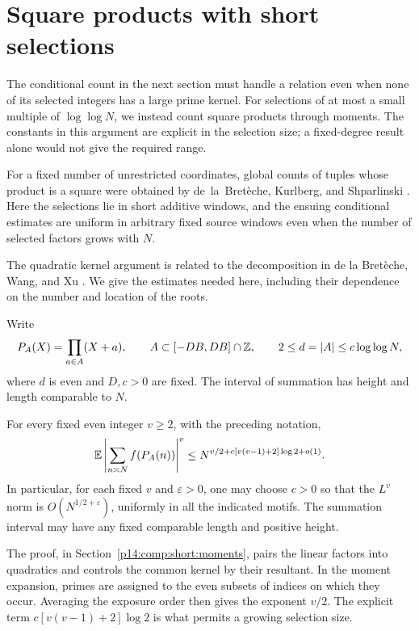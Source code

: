 \section{Square products with short selections}
\label{p13:short:section}

The conditional count in the next section must handle a relation
even when none of its selected integers has a large prime kernel.
For selections of at most a small multiple of \(\log\log N\),
we instead count square products through moments. The constants
in this argument are explicit in the selection size; a
fixed-degree result alone would not give the required range.

For a fixed number of unrestricted coordinates, global counts of
tuples whose product is a square were obtained by de~la~Bret\`eche,
Kurlberg, and Shparlinski
\cite[Theorem~2.2 and Corollary~2.4]{bretkurlbergshparlinski2021}.
Here the selections lie in short additive windows, and the ensuing
conditional estimates are uniform in arbitrary fixed source windows
even when the number of selected factors grows with $N$.

The quadratic kernel argument is related to the decomposition
in de la Bret\`eche, Wang, and Xu
\cite[Lemmas~6.2--6.3]{bretwngxu2026}. We give the estimates
needed here, including their dependence on the number and
location of the roots.


Write
\[
 P_A(X)=\prod_{a\in A}(X+a),\qquad
 A\subset[-DB,DB]\cap\mathbb Z,
 \qquad 2\le d=|A|\le c\log\log N,
\]
where $d$ is even and $D,c>0$ are fixed.  The interval of summation
has height and length comparable to $N$.

\begin{proposition}
\label{p13:short:moments}
For every fixed even integer \(v\ge2\), with the preceding notation,
\begin{equation}
 \mathbb E\left|\sum_{n\asymp N}f(P_A(n))\right|^v
 \le N^{v/2+c[v(v-1)+2]\log2+o(1)}.
 \label{p13:short:moment-bound}
\end{equation}
In particular, for each fixed \(v\) and \(\varepsilon>0\),
one may choose \(c>0\) so that the \(L^v\) norm is
\(O(N^{1/2+\varepsilon})\), uniformly in all the indicated
motifs. The summation interval may have any fixed comparable
length and positive height.
\end{proposition}

The proof, in Section~\ref{p14:comp:short:moments}, pairs the linear
factors into quadratics and controls the common kernel by their
resultant.  In the moment expansion, primes are assigned to the even
subsets of indices on which they occur.  Averaging the exposure order
then gives the exponent $v/2$.  The explicit term
$c[v(v-1)+2]\log2$ is what permits a growing selection size.

